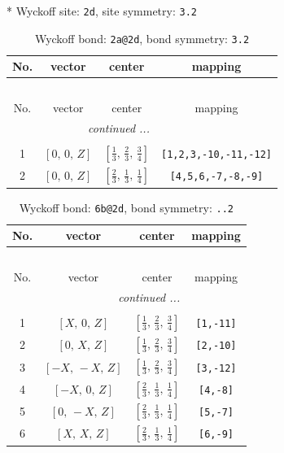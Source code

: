 \documentclass[fleqn,8pt]{jsarticle}
\begin{document}
* Wyckoff site: {\tt 2d}, site symmetry: {\tt 3.2}
\renewcommand{\arraystretch}{1.2}
\begin{longtable}{cccc}
\caption{Wyckoff bond: {\tt 2a@2d}, bond symmetry: {\tt 3.2}}
 \\
 \hline \hline
No. & vector & center & mapping \\ \hline \endfirsthead

\multicolumn{3}{l}{\tablename\ \thetable{}} \\
 \hline \hline
No. & vector & center & mapping \\ \hline \endhead

 \hline \hline
\multicolumn{3}{r}{\footnotesize\it continued ...} \\ \endfoot

 \hline \hline
\multicolumn{3}{r}{} \\ \endlastfoot

1 & $\left[ 0,\, 0,\, Z \right]$ & $\left[ \frac{1}{3},\, \frac{2}{3},\, \frac{3}{4} \right]$ & {\tt [1,2,3,-10,-11,-12]} \\ \hline
2 & $\left[ 0,\, 0,\, Z \right]$ & $\left[ \frac{2}{3},\, \frac{1}{3},\, \frac{1}{4} \right]$ & {\tt [4,5,6,-7,-8,-9]} \\
\end{longtable}
\renewcommand{\arraystretch}{1.2}
\begin{longtable}{cccc}
\caption{Wyckoff bond: {\tt 6b@2d}, bond symmetry: {\tt ..2}}
 \\
 \hline \hline
No. & vector & center & mapping \\ \hline \endfirsthead

\multicolumn{3}{l}{\tablename\ \thetable{}} \\
 \hline \hline
No. & vector & center & mapping \\ \hline \endhead

 \hline \hline
\multicolumn{3}{r}{\footnotesize\it continued ...} \\ \endfoot

 \hline \hline
\multicolumn{3}{r}{} \\ \endlastfoot

1 & $\left[ X,\, 0,\, Z \right]$ & $\left[ \frac{1}{3},\, \frac{2}{3},\, \frac{3}{4} \right]$ & {\tt [1,-11]} \\ \hline
2 & $\left[ 0,\, X,\, Z \right]$ & $\left[ \frac{1}{3},\, \frac{2}{3},\, \frac{3}{4} \right]$ & {\tt [2,-10]} \\ \hline
3 & $\left[ - X,\, - X,\, Z \right]$ & $\left[ \frac{1}{3},\, \frac{2}{3},\, \frac{3}{4} \right]$ & {\tt [3,-12]} \\ \hline
4 & $\left[ - X,\, 0,\, Z \right]$ & $\left[ \frac{2}{3},\, \frac{1}{3},\, \frac{1}{4} \right]$ & {\tt [4,-8]} \\ \hline
5 & $\left[ 0,\, - X,\, Z \right]$ & $\left[ \frac{2}{3},\, \frac{1}{3},\, \frac{1}{4} \right]$ & {\tt [5,-7]} \\ \hline
6 & $\left[ X,\, X,\, Z \right]$ & $\left[ \frac{2}{3},\, \frac{1}{3},\, \frac{1}{4} \right]$ & {\tt [6,-9]} \\
\end{longtable}
\end{document}
